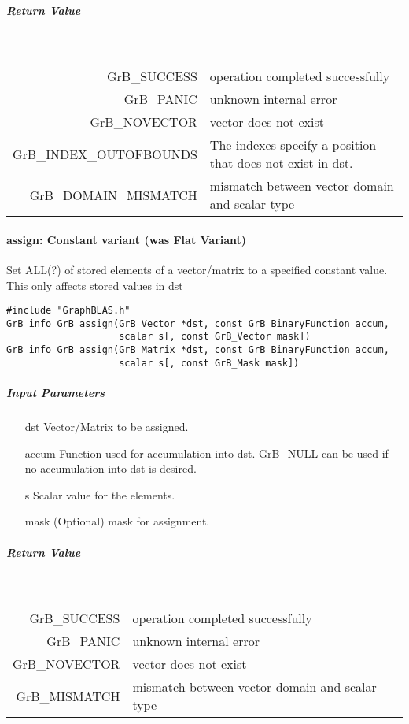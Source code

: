 \subparagraph{Return Value}~

\begin{tabular}{rl}
{\sf GrB\_SUCCESS}	& operation completed successfully \\
{\sf GrB\_PANIC}	& unknown internal error \\
{\sf GrB\_NOVECTOR}	& vector does not exist \\
{\sf GrB\_INDEX\_OUTOFBOUNDS} & The indexes specify a position that does not exist in dst. \\
{\sf GrB\_DOMAIN\_MISMATCH}	& mismatch between vector domain and scalar type \\
\end{tabular}

\paragraph{{\sf assign}: Constant variant (was Flat Variant)}

Set ALL(?) of stored elements of a vector/matrix to a specified constant value.
This only affects stored values in dst


\begin{verbatim}
#include "GraphBLAS.h"
GrB_info GrB_assign(GrB_Vector *dst, const GrB_BinaryFunction accum,
                    scalar s[, const GrB_Vector mask])
GrB_info GrB_assign(GrB_Matrix *dst, const GrB_BinaryFunction accum,
                    scalar s[, const GrB_Mask mask])
\end{verbatim}

\subparagraph{Input Parameters}

\begin{itemize}
	\item[{\sf dst}]   Vector/Matrix to be assigned.
	\item[{\sf accum}] Function used for accumulation into dst.  {\sf GrB\_NULL}
                       can be used if no accumulation into dst is desired.
	\item[{\sf s}]     Scalar value for the elements.
	\item[{\sf mask}]  (Optional) mask for assignment.  
\end{itemize}

\subparagraph{Return Value}~

\begin{tabular}{rl}
{\sf GrB\_SUCCESS}	& operation completed successfully \\
{\sf GrB\_PANIC}	& unknown internal error \\
{\sf GrB\_NOVECTOR}	& vector does not exist \\
{\sf GrB\_MISMATCH}	& mismatch between vector domain and scalar type \\
\end{tabular}
